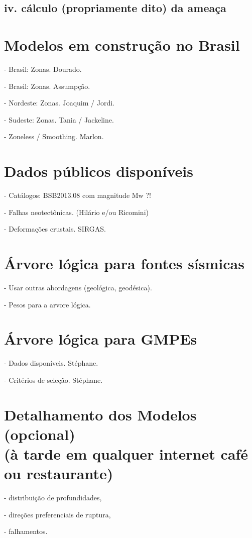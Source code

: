 \documentclass[a4paper,10pt,agenda]{meetingmins}
\begin{document}
	\subsection{iv. cálculo (propriamente dito) da ameaça}



\section{Modelos em construção no Brasil}
	
	- Brasil: Zonas. Dourado.

	- Brasil: Zonas. Assumpção.
	
	- Nordeste: Zonas. Joaquim / Jordi.
	
	- Sudeste: Zonas. Tania / Jackeline.
	
	- Zoneless / Smoothing. Marlon.
	


\section{Dados públicos disponíveis}
	
	- Catálogos: BSB2013.08 com magnitude Mw ?!
		
	- Falhas neotectônicas. (Hilário e/ou Ricomini)
		
	- Deformações crustais. SIRGAS.



\section{Árvore lógica para fontes sísmicas}
	
	- Usar outras abordagens (geológica, geodésica).
	
	- Pesos para a arvore lógica.


\section{Árvore lógica para GMPEs}
	
	- Dados disponíveis. Stéphane.

	- Critérios de seleção. Stéphane.


\section{Detalhamento dos Modelos (opcional)\\
	(à tarde em qualquer internet café ou restaurante)}
	
	- distribuição de profundidades,

	- direções preferenciais de ruptura, 

	- falhamentos.
	


\vspace{1em}

\end{document}
